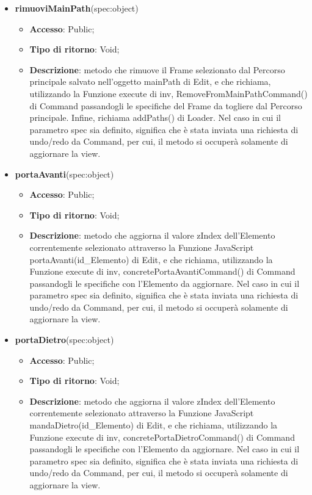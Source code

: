 {{\begin{itemize}
\begin{itemize}
			\end{itemize}
			\item \textbf{rimuoviMainPath}(spec:object)
			\begin{itemize}
				\item \textbf{Accesso}: Public;
				\item \textbf{Tipo di ritorno}: Void;
				\item \textbf{Descrizione}: metodo che rimuove il Frame selezionato dal Percorso principale salvato nell'oggetto mainPath di Edit, e che richiama, utilizzando la Funzione execute di inv, RemoveFromMainPathCommand() di Command passandogli le specifiche del Frame da togliere dal Percorso principale. Infine, richiama addPaths() di Loader. Nel caso in cui il parametro spec sia definito, significa che è stata inviata una richiesta di undo/redo da Command, per cui, il metodo si occuperà solamente di aggiornare la view.
			\end{itemize}
			\item \textbf{portaAvanti}(spec:object)
			\begin{itemize}
				\item \textbf{Accesso}: Public;
				\item \textbf{Tipo di ritorno}: Void;
				\item \textbf{Descrizione}: metodo che aggiorna il valore zIndex dell'Elemento correntemente selezionato attraverso la Funzione\ped{g} JavaScript portaAvanti(id\_Elemento) di Edit, e che richiama, utilizzando la Funzione execute di inv, concretePortaAvantiCommand() di Command passandogli le specifiche con l'Elemento da aggiornare. Nel caso in cui il parametro spec sia definito, significa che è stata inviata una richiesta di undo/redo da Command, per cui, il metodo si occuperà solamente di aggiornare la view.
			\end{itemize}
			\item \textbf{portaDietro}(spec:object)
			\begin{itemize}
				\item \textbf{Accesso}: Public;
				\item \textbf{Tipo di ritorno}: Void;
				\item \textbf{Descrizione}: metodo che aggiorna il valore zIndex dell'Elemento correntemente selezionato attraverso la Funzione\ped{g} JavaScript mandaDietro(id\_Elemento) di Edit, e che richiama, utilizzando la Funzione execute di inv, concretePortaDietroCommand() di Command passandogli le specifiche con l'Elemento da aggiornare. Nel caso in cui il parametro spec sia definito, significa che è stata inviata una richiesta di undo/redo da Command, per cui, il metodo si occuperà solamente di aggiornare la view.

\end{itemize}
\end{itemize}}}
